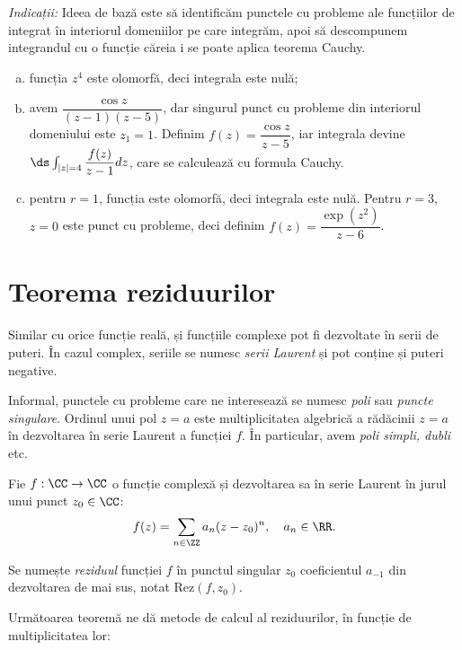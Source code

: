 \emph{Indicații:} Ideea de bază este să identificăm punctele cu probleme ale
funcțiilor de integrat în interiorul domeniilor pe care integrăm, apoi să descompunem
integrandul cu o funcție căreia i se poate aplica teorema Cauchy.
\begin{enumerate}[(a)]
\item funcția $ z^4 $ este olomorfă, deci integrala este nulă;
\item avem $ \dfrac{\cos z}{(z - 1)(z - 5)} $, dar singurul punct cu probleme din interiorul
  domeniului este $ z_1 = 1 $. Definim $ f(z) = \dfrac{\cos z}{z - 5} $, iar integrala
  devine $ \ds\int_{|z| = 4} \dfrac{f(z)}{z - 1} dz $, care se calculează cu formula Cauchy.
\item pentru $ r = 1 $, funcția este olomorfă, deci integrala este nulă. Pentru $ r = 3 $,
  $ z = 0 $ este punct cu probleme, deci definim $ f(z) = \dfrac{\exp(z^2)}{z - 6} $.
\end{enumerate}


\section{Teorema reziduurilor}

Similar cu orice funcție reală, și funcțiile complexe pot fi dezvoltate în serii
de puteri. În cazul complex, seriile se numesc \emph{serii Laurent} și pot conține
și puteri negative.

Informal, punctele cu probleme care ne interesează se numesc \emph{poli}
sau \emph{puncte singulare}. Ordinul unui pol $ z = a $ este multiplicitatea algebrică
a rădăcinii $ z = a $ în dezvoltarea în serie Laurent a funcției $ f $. În particular,
avem \emph{poli simpli, dubli} etc.

\begin{definition}\label{def:rez}
  Fie $ f : \CC \to \CC $ o funcție complexă și dezvoltarea sa în serie Laurent
  în jurul unui punct $ z_0 \in \CC $:
  \[
    f(z) = \sum_{n \in \ZZ} a_n (z - z_0)^n, \quad a_n \in \RR.
  \]

  Se numește \emph{reziduul} funcției $ f $ în punctul singular $ z_0 $ coeficientul
  $ a_{-1} $ din dezvoltarea de mai sus, notat $ \mathrm{Rez}(f, z_0) $.
\end{definition}

Următoarea teoremă ne dă metode de calcul al reziduurilor, în funcție de multiplicitatea
lor:


